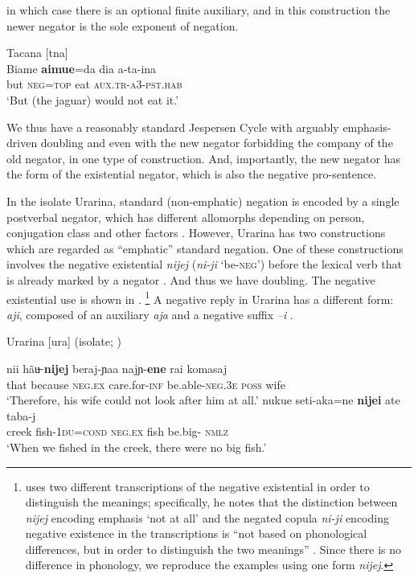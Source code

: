 ﻿\documentclass[output=paper]{langsci/langscibook}
\begin{document}
in which case there is an optional finite auxiliary, and in this
construction the newer negator is the sole exponent of negation.
%
\begin{exe}\ex\label{ex:int-tacana-jaguar}
 Tacana [tna]   \\
    \gll    Biame    \textbf{aimue}=da  dia  {\op}a-ta-ina{\cp}  \\
    but    \textsc{neg=top}  eat  \textsc{aux.tr-a3-pst.hab}  \\
    \glt `But (the jaguar) would not eat it.'
    \end{exe}
%
We thus have a reasonably standard Jespersen Cycle with arguably
emphasis-driven doubling and even with the new negator forbidding the
company of the old negator, in one type of construction. And, importantly,
the new negator has the form of the existential negator, which is also the
negative pro-sentence.

In the isolate Urarina, standard (non-emphatic) negation is encoded by a
single postverbal negator, which has different allomorphs depending on
person, conjugation class and other factors \citep[484]{Olawsky2006}.
However, Urarina has two constructions which are regarded as ``emphatic''
standard negation. One of these constructions involves the negative
existential \textit{nijej} (\textit{ni-ji} `be-\textsc{neg}') before the
lexical verb that is already marked by a negator . And thus
we have doubling. The negative existential use is shown in
.%
%
\footnote{\textcite{Olawsky2006} uses two different
transcriptions of the negative existential in order to distinguish the
meanings; specifically, he notes that the distinction between
\textit{nijej} encoding emphasis `not at all' and the negated copula
\textit{ni-ji} encoding negative existence in the transcriptions is ``not
based on phonological differences, but in order to distinguish the two
meanings'' \parencite[555, footnote 65]{Olawsky2006}. Since there is no
difference in phonology, we reproduce the examples using one form
\textit{nijej}.} %
%
A negative reply in Urarina has a different form:
\textit{aji}, composed of an auxiliary \textit{aja} and a negative suffix
\textit{–i} \parencite[400]{Olawsky2006}. 
%
\begin{exe}\ex\label{ex:int-urarina-wife-fish}
Urarina [ura] (isolate; \citealt[554, 556]{Olawsky2006})
    \begin{xlist}
    \ex\label{ex:int-urarina-wife}
    \gll nii hãu̶ \textbf{nijej} beraj-ɲaa najɲ-\textbf{ene}    
    rai      komasaj \\
    that because \textsc{neg.ex} care.for-\textsc{inf}
    be.able-\textsc{neg.3e} \textsc{poss}   wife\\
    \glt `Therefore, his wife could not look after him at all.'
    \ex\label{ex:int-urarina-fish}
    \gll nukue  seti-aka=ne    \textbf{nijei}  ate  taba-j \\
    creek   fish-\textsc{1du=cond}       \textsc{neg.ex}  fish   
    be.big- \textsc{nmlz}\\
    \glt `When we fished in the creek, there were no big fish.'
    \end{xlist}\end{exe}
\end{document}

